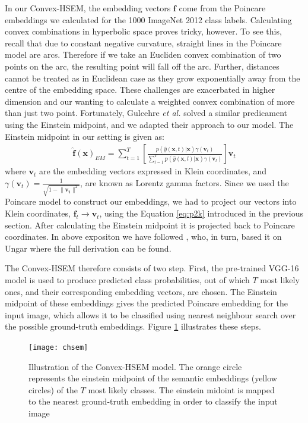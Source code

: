 \documentclass[12pt]{report}
\begin{document}
In our Convex-HSEM, the embedding vectors $\mathbf{f}$ come from the Poincare embeddings we calculated for the 1000 ImageNet 2012 class labels. Calculating convex combinations in hyperbolic space proves tricky, however. To see this, recall that due to constant negative curvature, straight lines in the Poincare model are arcs. Therefore if we take an Eucliden convex combination of two points on the arc, the resulting point will fall off the arc. Further, distances cannot be treated as in Euclidean case as they grow exponentially away from the centre of the embedding space. These challenges are exacerbated in higher dimension and our wanting to calculate a weighted convex combination of more than just two point. Fortunately, Gulcehre \textit{et al.} \cite{Gulcehre2018} solved a similar predicament using the Einstein midpoint, and we adapted their approach to our model. The Einstein midpoint in our setting is given as:
\begin{align*}
  \mathbf{\hat{f}(\mathbf{x})}_{EM} = \sum_{t=1}^T \left[\frac{p(\hat{y}(\mathbf{x}, t)|\mathbf{x})\gamma(\mathbf{v}_t)}{\sum_{l=1}^T p(\hat{y}(\mathbf{x}, l)|\mathbf{x})\gamma(\mathbf{v}_l)}\right]\mathbf{v}_t
\end{align*}
where $\mathbf{v}_t$ are the embedding vectors expressed in Klein coordinates, and  $\gamma(\mathbf{v}_t)=\frac{1}{\sqrt{1 - \lVert\mathbf{v_t}\rVert^2}}$, are known as Lorentz gamma factors. Since we used the Poincare model to construct our embeddings, we had to project our vectors into Klein coordinates, $\mathbf{f}_t \rightarrow \mathbf{v}_t$, using the Equation \ref{eq:p2k} introduced in the previous section. After calculating the Einstein midpoint it is projected back to Poincare coordinates. In above expositon we have followed \cite{Gulcehre2018}, who, in turn, based it on Ungar \cite{Ungar2013, Ungar2005} where the full derivation can be found. 

The Convex-HSEM therefore consists of two step. First, the pre-trained VGG-16 model is used to produce predicted class probabilities, out of which $T$ most likely ones, and their corresponding embedding vectors, are chosen. The Einstein midpoint of these embeddings gives the predicted Poincare embedding for the input image, which allows it to be classified using nearest neighbour search over the possible ground-truth embeddings. Figure \ref{fig:chsem} illustrates these steps. 

\begin{figure}
  \centering
  \texttt{[image: chsem]}
  \caption{Illustration of the Convex-HSEM model. The orange circle represents the einstein midpoint of the semantic embeddings (yellow circles) of the $T$ most likely classes. The einstein midoint is mapped to the nearest ground-truth embedding in order to classify the input image}
  \label{fig:chsem}
\end{figure}
\end{document}
